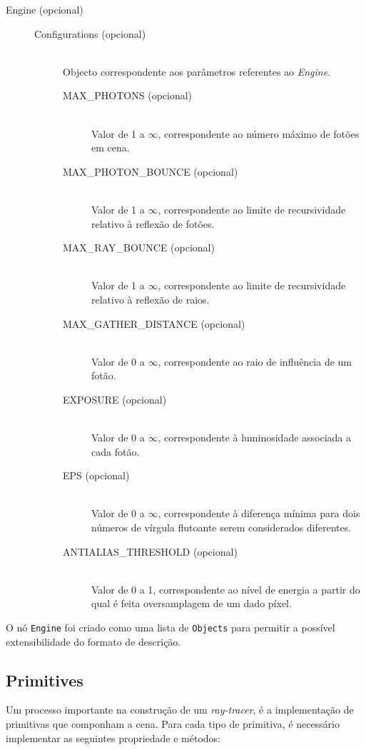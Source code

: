 \documentclass[a4paper]{article}
\begin{document}
\begin{description}
	\item[Engine (opcional)] \hfill
		\begin{description}
			\item[Configurations (opcional)] \hfill \\
				Objecto correspondente aos parâmetros referentes ao \emph{Engine}.
				\begin{description}
					\item[MAX\_PHOTONS (opcional)] \hfill \\
						Valor de 1 a $\infty$, correspondente ao número máximo de fotões em cena.
					\item[MAX\_PHOTON\_BOUNCE (opcional)] \hfill \\
						Valor de 1 a $\infty$, correspondente ao limite de recursividade relativo à reflexão de fotões.
					\item[MAX\_RAY\_BOUNCE (opcional)] \hfill \\
						Valor de 1 a $\infty$, correspondente ao limite de recursividade relativo à reflexão de raios.
					\item[MAX\_GATHER\_DISTANCE (opcional)] \hfill \\
						Valor de 0 a $\infty$, correspondente ao raio de influência de um fotão.
					\item[EXPOSURE (opcional)] \hfill \\
						Valor de 0 a $\infty$, correspondente à luminosidade associada a cada fotão.
					\item[EPS (opcional)] \hfill \\
						Valor de 0 a $\infty$, correspondente à diferença mínima para dois números de vírgula flutoante serem considerados diferentes.
					\item[ANTIALIAS\_THRESHOLD (opcional)] \hfill \\
						Valor de 0 a 1, correspondente ao nível de energia a partir do qual é feita oversamplagem de um dado píxel.
				\end{description}
		\end{description}
\end{description}

O nó \texttt{Engine} foi criado como uma lista de \texttt{Objects} para permitir a possível extensibilidade do formato de descrição.

\cleardoublepage
\subsection{Primitives}
\label{sec:primitives}
\indent \indent Um processo importante na construção de um \emph{ray-tracer}, é a implementação de primitivas que componham a cena.
Para cada tipo de primitiva, é necessário implementar as seguintes propriedade e métodos:
\end{document}
